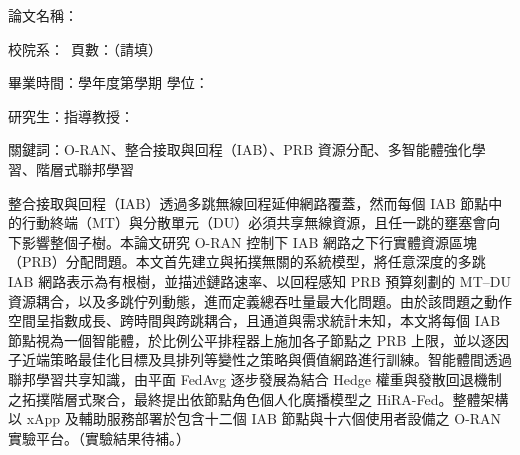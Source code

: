 \begin{ZhAbstract}
    \begin{ZhAbstractItems}
        \noindent 論文名稱：\cTitle

        \noindent 校院系：\univCname\ \deptCname \hfill 頁數：（請填）

        \noindent 畢業時間：\cAcademicYear 學年度第\cGraduateSemester 學期 \hfill 學位：\degreeCname

        \noindent 研究生：\myCname \hfill 指導教授：\advisorCname

        \noindent 關鍵詞：O-RAN、整合接取與回程（IAB）、PRB 資源分配、多智能體強化學習、階層式聯邦學習

    \end{ZhAbstractItems}

    \begin{ZhAbstractDescription}
        整合接取與回程（IAB）透過多跳無線回程延伸網路覆蓋，然而每個 IAB 節點中的行動終端（MT）與分散單元（DU）必須共享無線資源，且任一跳的壅塞會向下影響整個子樹。本論文研究 O-RAN 控制下 IAB 網路之下行實體資源區塊（PRB）分配問題。本文首先建立與拓撲無關的系統模型，將任意深度的多跳 IAB 網路表示為有根樹，並描述鏈路速率、以回程感知 PRB 預算刻劃的 MT--DU 資源耦合，以及多跳佇列動態，進而定義總吞吐量最大化問題。由於該問題之動作空間呈指數成長、跨時間與跨跳耦合，且通道與需求統計未知，本文將每個 IAB 節點視為一個智能體，於比例公平排程器上施加各子節點之 PRB 上限，並以逐因子近端策略最佳化目標及具排列等變性之策略與價值網路進行訓練。智能體間透過聯邦學習共享知識，由平面 FedAvg 逐步發展為結合 Hedge 權重與發散回退機制之拓撲階層式聚合，最終提出依節點角色個人化廣播模型之 HiRA-Fed。整體架構以 xApp 及輔助服務部署於包含十二個 IAB 節點與十六個使用者設備之 O-RAN 實驗平台。（實驗結果待補。）
    \end{ZhAbstractDescription}

\end{ZhAbstract}
